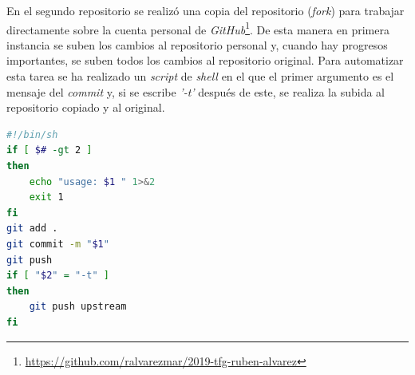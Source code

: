 En el segundo repositorio se realizó una copia del repositorio (\textit{fork}) para trabajar directamente sobre la cuenta personal de \textit{GitHub}\footnote{\url{https://github.com/ralvarezmar/2019-tfg-ruben-alvarez}}. De esta manera en primera instancia se suben los cambios al repositorio personal y, cuando hay progresos importantes, se suben todos los cambios al repositorio original. Para automatizar esta tarea se ha realizado un \textit{script} de \textit{shell} en el que el primer argumento es el mensaje del \textit{commit} y, si se escribe \textit{'-t'} después de este, se realiza la subida al repositorio copiado y al original. 

\begin{lstlisting}[language=bash, caption=\textit{Script} para subir código a \textit{GitHub}]
#!/bin/sh
if [ $# -gt 2 ]
then
	echo "usage: $1 " 1>&2
	exit 1
fi
git add .
git commit -m "$1"
git push
if [ "$2" = "-t" ]
then
	git push upstream
fi
\end{lstlisting}